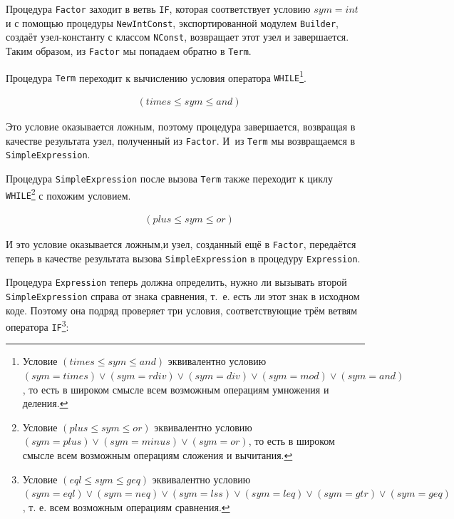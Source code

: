 \documentclass[utf8]{lgu}
\newcommand{\tire}{\unskip\nobreak\thinspace\textemdash\thinspace}
\newcommand{\code}[1]{{\normalsize\texttt{#1}}}
\begin{document}
Процедура \code{Factor} заходит в ветвь \code{IF}, которая соответствует условию $\mathit{sym} = int$ и с помощью процедуры \code{NewIntConst}, экспортированной модулем \code{Builder}, создаёт узел-константу с классом \code{NConst}, возвращает этот узел и завершается. Таким образом, из \code{Factor} мы попадаем обратно в \code{Term}.

Процедура \code{Term} переходит к вычислению условия оператора \code{WHILE}\footnote{Условие $(\mathit{times} \leqslant \mathit{sym} \leqslant \mathit{and})$ эквивалентно условию $(\mathit{sym} = \mathit{times}) \vee (\mathit{sym} = \mathit{rdiv}) \vee (\mathit{sym} = \mathit{div}) \vee (\mathit{sym} = \mathit{mod}) \vee (\mathit{sym} = \mathit{and})$, то есть в широком смысле всем возможным операциям умножения и деления.}.

\begin{align}
& (\mathit{times} \leqslant \mathit{sym} \leqslant \mathit{and})
\end{align}

Это условие оказывается ложным, поэтому процедура завершается, возвращая в качестве результата узел, полученный из \code{Factor}. И~из \code{Term} мы возвращаемся в \code{SimpleExpression}.

Процедура \code{SimpleExpression} после вызова \code{Term} также переходит к циклу \code{WHILE}\footnote{Условие $(\mathit{plus} \leqslant \mathit{sym} \leqslant \mathit{or})$ эквивалентно условию $(\mathit{sym} = \mathit{plus}) \vee (\mathit{sym} = \mathit{minus}) \vee (\mathit{sym} = \mathit{or})$, то есть в широком смысле всем возможным операциям сложения и вычитания.} с похожим условием.

\begin{align}
& (\mathit{plus} \leqslant \mathit{sym} \leqslant \mathit{or})
\end{align}

И это условие оказывается ложным,\tire и узел, созданный ещё в \code{Factor}, передаётся теперь в качестве результата вызова \code{SimpleExpression} в процедуру \code{Expression}.

Процедура \code{Expression} теперь должна определить, нужно ли вызывать второй \code{SimpleExpression} справа от знака сравнения, т.~е. есть ли этот знак в исходном коде. Поэтому она подряд проверяет три условия, соответствующие трём ветвям оператора \code{IF}\footnote{Условие $(\mathit{eql} \leqslant \mathit{sym} \leqslant \mathit{geq})$ эквивалентно условию $(\mathit{sym} = \mathit{eql}) \vee (\mathit{sym} = \mathit{neq}) \vee (\mathit{sym} = \mathit{lss}) \vee (\mathit{sym} = \mathit{leq}) \vee (\mathit{sym} = \mathit{gtr}) \vee (\mathit{sym} = \mathit{geq})$, т. е. всем возможным операциям сравнения.}:
\end{document}
